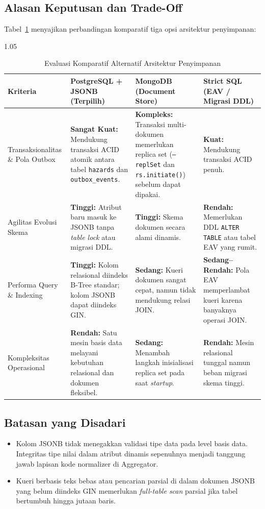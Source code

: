 \clearpage
\subsection{Alasan Keputusan dan Trade-Off}
Tabel~\ref{tab:storage_eval} menyajikan perbandingan komparatif tiga opsi arsitektur penyimpanan:

\begin{table}[H]
\centering
\footnotesize
\begin{spacing}{1.05}
\caption{Evaluasi Komparatif Alternatif Arsitektur Penyimpanan}
\label{tab:storage_eval}
\begin{tabularx}{\textwidth}{p{2.8cm} X X X}
\toprule
\textbf{Kriteria} & \textbf{PostgreSQL + JSONB (Terpilih)} & \textbf{MongoDB (Document Store)} & \textbf{Strict SQL (EAV / Migrasi DDL)} \\
\midrule
Transaksionalitas \& Pola Outbox & \textbf{Sangat Kuat:} Mendukung transaksi ACID atomik antara tabel \texttt{hazards} dan \texttt{outbox\_events}. & \textbf{Kompleks:} Transaksi \mbox{multi-dokumen} memerlukan replica set (\texttt{--replSet} dan \texttt{rs.initiate()}) sebelum dapat dipakai. & \textbf{Kuat:} Mendukung transaksi ACID penuh. \\
\addlinespace
Agilitas Evolusi Skema & \textbf{Tinggi:} Atribut baru masuk ke JSONB tanpa \textit{table lock} atau migrasi DDL. & \textbf{Tinggi:} Skema dokumen secara alami dinamis. & \textbf{Rendah:} Memerlukan DDL \texttt{ALTER TABLE} atau tabel EAV yang rumit. \\
\addlinespace
Performa Query \& Indexing & \textbf{Tinggi:} Kolom relasional diindeks B-Tree standar; kolom JSONB dapat diindeks GIN. & \textbf{Sedang:} Kueri dokumen sangat cepat, namun tidak mendukung relasi JOIN. & \textbf{Sedang--Rendah:} Pola EAV memperlambat kueri karena banyaknya operasi JOIN. \\
\addlinespace
Kompleksitas Operasional & \textbf{Rendah:} Satu mesin basis data melayani kebutuhan relasional dan dokumen fleksibel. & \textbf{Sedang:} Menambah langkah inisialisasi replica set pada saat \textit{startup}. & \textbf{Rendah:} Mesin relasional tunggal namun beban migrasi skema tinggi. \\
\bottomrule
\end{tabularx}
\end{spacing}
\end{table}

\subsection{Batasan yang Disadari}
\begin{itemize}
    \item Kolom JSONB tidak menegakkan validasi tipe data pada level basis data. Integritas tipe nilai dalam atribut dinamis sepenuhnya menjadi tanggung jawab lapisan kode normalizer di Aggregator.
    \item Kueri berbasis teks bebas atau pencarian parsial di dalam dokumen \mbox{JSONB} yang belum diindeks GIN memerlukan \textit{full-table scan} parsial jika tabel bertumbuh hingga jutaan baris.
\end{itemize}

